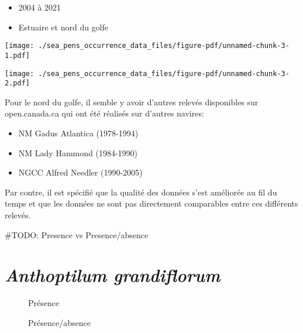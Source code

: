\documentclass[
  letterpaper,
  DIV=11,
  numbers=noendperiod]{scrreprt}
\providecommand{\tightlist}{%
  \setlength{\itemsep}{0pt}\setlength{\parskip}{0pt}}\usepackage{longtable,booktabs,array}
\begin{document}
\begin{itemize}
\tightlist
\item
  2004 à 2021
\item
  Estuaire et nord du golfe
\end{itemize}

\texttt{[image: ./sea\_pens\_occurrence\_data\_files/figure-pdf/unnamed-chunk-3-1.pdf]}

\texttt{[image: ./sea\_pens\_occurrence\_data\_files/figure-pdf/unnamed-chunk-3-2.pdf]}

Pour le nord du golfe, il semble y avoir d'autres relevés disponibles
sur open.canada.ca qui ont été réalisés sur d'autres navires:

\begin{itemize}
\item
  NM Gadus Atlantica (1978-1994)
\item
  NM Lady Hammond (1984-1990)
\item
  NGCC Alfred Needler (1990-2005)
\end{itemize}

Par contre, il est spécifié que la qualité des données s'est améliorée
au fil du temps et que les données ne sont pas directement comparables
entre ces différents relevés.

\#TODO: Presence vs Presence/absence

\hypertarget{anthoptilum-grandiflorum}{%
\section*{\texorpdfstring{\emph{Anthoptilum
grandiflorum}}{Anthoptilum grandiflorum}}\label{anthoptilum-grandiflorum}}


\begin{figure}

\begin{minipage}[t]{\linewidth}

{\centering 


\caption{Présence}

}

\end{minipage}%
\newline
\begin{minipage}[t]{\linewidth}

{\centering 


\caption{Présence/absence}

}

\end{minipage}%

\end{figure}
\end{document}
